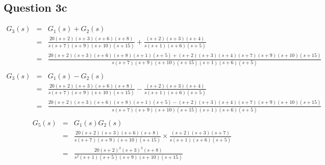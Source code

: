 \documentclass[12pt, a4paper]{article}
\begin{document}
		\subsection*{Question 3c}
		\label{sub:question_3c}
		\begin{equation}
			\begin{array}{rcl}
				G_3(s) & = & G_1(s)+G_2(s)\\
				& = & \frac{20(s+2)(s+3)(s+6)(s+8)}{s(s+7)(s+9)(s+10)(s+15)} + \frac{(s+2)(s+3)(s+4)}{s(s+1)(s+6)(s+5)}\\
				& = & \frac{20(s+2)(s+3)(s+6)(s+8)(s+1)(s+5)+(s+2)(s+3)(s+4)(s+7)(s+9)(s+10)(s+15)}{s(s+7)(s+9)(s+10)(s+15)(s+1)(s+6)(s+5)}\\
			\end{array}
		\end{equation}
		\begin{equation}
			\begin{array}{rcl}
				G_3(s) & = & G_1(s)-G_2(s)\\
				& = & \frac{20(s+2)(s+3)(s+6)(s+8)}{s(s+7)(s+9)(s+10)(s+15)} - \frac{(s+2)(s+3)(s+4)}{s(s+1)(s+6)(s+5)}\\
				& = & \frac{20(s+2)(s+3)(s+6)(s+8)(s+1)(s+5)-(s+2)(s+3)(s+4)(s+7)(s+9)(s+10)(s+15)}{s(s+7)(s+9)(s+10)(s+15)(s+1)(s+6)(s+5)}\\
			\end{array}
		\end{equation}
		\begin{equation}
			\begin{array}{rcl}
				G_5(s) & = & G_1(s)G_2(s)\\
				& = & \frac{20(s+2)(s+3)(s+6)(s+8)}{s(s+7)(s+9)(s+10)(s+15)}{} \times \frac{(s+2)(s+3)(s+7)}{s(s+1)(s+6)(s+5)}\\
				& = & \frac{20(s+2)^2(s+3)^3(s+8)}{s^2(s+1)(s+5)(s+9)(s+10)(s+15)}
			\end{array}
		\end{equation}
\end{document}
